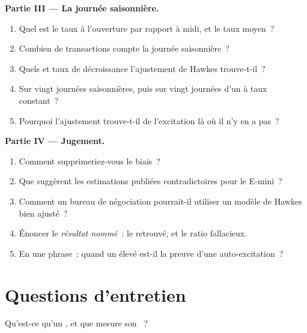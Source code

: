 \begin{problem}
\medskip\noindent\textbf{Partie III --- La journée saisonnière.}
\begin{enumerate}[resume]
\item Quel est le taux à l'ouverture par rapport à midi, et le taux moyen~?
\item Combien de transactions compte la journée saisonnière~?
\item Quels  et taux de décroissance l'ajustement de Hawkes trouve-t-il~?
\item Sur vingt journées saisonnières, puis sur vingt journées d'un  à taux constant~?
\item Pourquoi l'ajustement trouve-t-il de l'excitation là où il n'y en a pas~?
\end{enumerate}

\medskip\noindent\textbf{Partie IV --- Jugement.}
\begin{enumerate}[resume]
\item Comment supprimeriez-vous le biais~?
\item Que suggèrent les estimations publiées contradictoires pour le E-mini~?
\item Comment un bureau de négociation pourrait-il utiliser un modèle de Hawkes bien ajusté~?
\item Énoncer le \emph{résultat nommé}~: le  retrouvé, et le ratio fallacieux.
\item En une phrase~: quand un  élevé est-il la preuve d'une auto-excitation~?
\end{enumerate}
\end{problem}

\section{Questions d'entretien}

\begin{interviewq}\label{iq:qm:point-processes-and-hawkes-processes:1}
Qu'est-ce qu'un , et que mesure son ~?
\end{interviewq}

